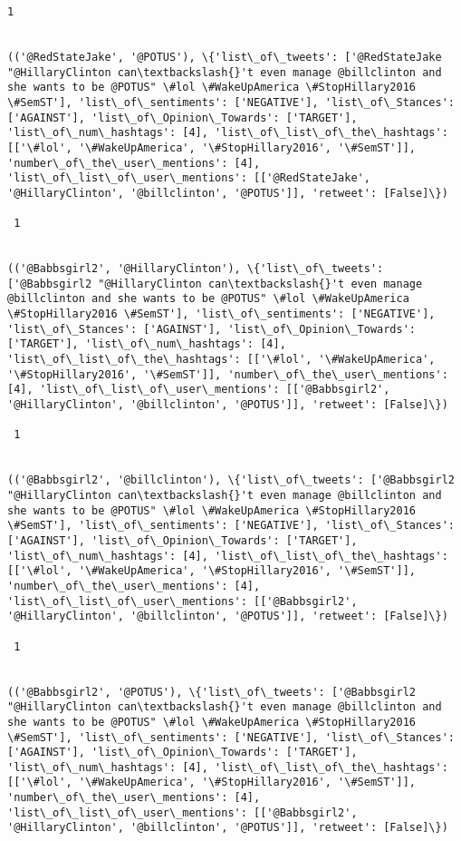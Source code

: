 \documentclass[11pt]{article}
\begin{document}
\begin{Verbatim}[commandchars=\\\{\}]
 1
 

(('@RedStateJake', '@POTUS'), \{'list\_of\_tweets': ['@RedStateJake "@HillaryClinton can\textbackslash{}'t even manage @billclinton and she wants to be @POTUS" \#lol \#WakeUpAmerica \#StopHillary2016 \#SemST'], 'list\_of\_sentiments': ['NEGATIVE'], 'list\_of\_Stances': ['AGAINST'], 'list\_of\_Opinion\_Towards': ['TARGET'], 'list\_of\_num\_hashtags': [4], 'list\_of\_list\_of\_the\_hashtags': [['\#lol', '\#WakeUpAmerica', '\#StopHillary2016', '\#SemST']], 'number\_of\_the\_user\_mentions': [4], 'list\_of\_list\_of\_user\_mentions': [['@RedStateJake', '@HillaryClinton', '@billclinton', '@POTUS']], 'retweet': [False]\})

 1
 

(('@Babbsgirl2', '@HillaryClinton'), \{'list\_of\_tweets': ['@Babbsgirl2 "@HillaryClinton can\textbackslash{}'t even manage @billclinton and she wants to be @POTUS" \#lol \#WakeUpAmerica \#StopHillary2016 \#SemST'], 'list\_of\_sentiments': ['NEGATIVE'], 'list\_of\_Stances': ['AGAINST'], 'list\_of\_Opinion\_Towards': ['TARGET'], 'list\_of\_num\_hashtags': [4], 'list\_of\_list\_of\_the\_hashtags': [['\#lol', '\#WakeUpAmerica', '\#StopHillary2016', '\#SemST']], 'number\_of\_the\_user\_mentions': [4], 'list\_of\_list\_of\_user\_mentions': [['@Babbsgirl2', '@HillaryClinton', '@billclinton', '@POTUS']], 'retweet': [False]\})

 1
 

(('@Babbsgirl2', '@billclinton'), \{'list\_of\_tweets': ['@Babbsgirl2 "@HillaryClinton can\textbackslash{}'t even manage @billclinton and she wants to be @POTUS" \#lol \#WakeUpAmerica \#StopHillary2016 \#SemST'], 'list\_of\_sentiments': ['NEGATIVE'], 'list\_of\_Stances': ['AGAINST'], 'list\_of\_Opinion\_Towards': ['TARGET'], 'list\_of\_num\_hashtags': [4], 'list\_of\_list\_of\_the\_hashtags': [['\#lol', '\#WakeUpAmerica', '\#StopHillary2016', '\#SemST']], 'number\_of\_the\_user\_mentions': [4], 'list\_of\_list\_of\_user\_mentions': [['@Babbsgirl2', '@HillaryClinton', '@billclinton', '@POTUS']], 'retweet': [False]\})

 1
 

(('@Babbsgirl2', '@POTUS'), \{'list\_of\_tweets': ['@Babbsgirl2 "@HillaryClinton can\textbackslash{}'t even manage @billclinton and she wants to be @POTUS" \#lol \#WakeUpAmerica \#StopHillary2016 \#SemST'], 'list\_of\_sentiments': ['NEGATIVE'], 'list\_of\_Stances': ['AGAINST'], 'list\_of\_Opinion\_Towards': ['TARGET'], 'list\_of\_num\_hashtags': [4], 'list\_of\_list\_of\_the\_hashtags': [['\#lol', '\#WakeUpAmerica', '\#StopHillary2016', '\#SemST']], 'number\_of\_the\_user\_mentions': [4], 'list\_of\_list\_of\_user\_mentions': [['@Babbsgirl2', '@HillaryClinton', '@billclinton', '@POTUS']], 'retweet': [False]\})


\end{Verbatim}
\end{document}

